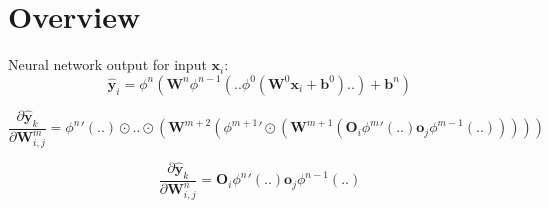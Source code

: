 \documentclass{article}
\begin{document}
\section{Overview}

Neural network output for input $\textbf{x}_i$:
$$\hat{\textbf{y}}_i=\phi^n(\textbf{W}^n\phi^{n-1}(..\phi^{0}(\textbf{W}^0\textbf{x}_i+\textbf{b}^0)..)+\textbf{b}^n)$$

$$\frac{\partial \hat{\textbf{y}}_k}{\partial \textbf{W}^m_{i,j}}={\phi^n}'(..)\odot..\odot(\textbf{W}^{m+2}({\phi^{m+1}}'\odot(\textbf{W}^{m+1}(\textbf{O}_i{\phi^{m}}'(..)\textbf{o}_j\phi^{m-1}(..)))))$$

$$\frac{\partial \hat{\textbf{y}}_k}{\partial \textbf{W}^n_{i,j}}=\textbf{O}_i{\phi^{n}}'(..)\textbf{o}_j\phi^{n-1}(..)$$
\end{document}
